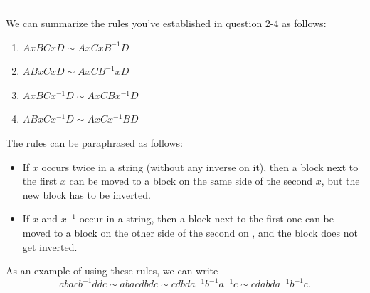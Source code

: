 \documentclass[a4paper, 12pt]{article}
\begin{document}
\noindent\rule{7in}{2.8pt}

\begin{background}
We can summarize the rules you've established in question 2-4 as follows:
\begin{enumerate}[(1)]
\item \(AxBCxD\sim AxCxB^{-1}D\)
\item \(ABxCxD\sim AxCB^{-1}xD\)
\item \(AxBCx^{-1}D\sim AxCBx^{-1}D\)
\item \(ABxCx^{-1}D\sim AxCx^{-1}BD\) 
\end{enumerate}
The rules can be paraphrased as follows:
\begin{itemize}
\item If \(x\) occurs twice in a string (without any inverse on it), then a block next to the first \(x\) can be moved to a block on the same side of the second \(x\), but the new block has to be inverted.
\item If \(x\) and \(x^{-1}\) occur in a string, then a block next to the first one can be moved to a block on the other side of the second on , and the block does not get inverted. 
\end{itemize}
As an example of using these rules, we can write 
\[abacb^{-1}ddc\sim abacdbdc\sim cdbda^{-1}b^{-1}a^{-1}c\sim cdabda^{-1}b^{-1}c.\]
\end{background}
\end{document}
